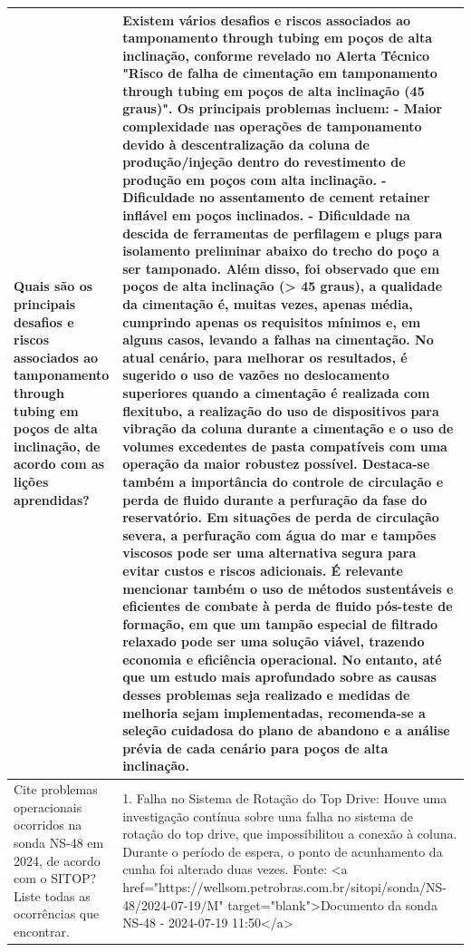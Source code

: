\begin{landscape}
\begin{longtable}{|p{3cm}|p{22cm}|}
Quais são os principais desafios e riscos associados ao tamponamento through tubing em poços de alta inclinação, de acordo com as lições aprendidas? & Existem vários desafios e riscos associados ao tamponamento through tubing em poços de alta inclinação, conforme revelado no Alerta Técnico "Risco de falha de cimentação em tamponamento through tubing em poços de alta inclinação (45 graus)". Os principais problemas incluem:
        \newline        - Maior complexidade nas operações de tamponamento devido à descentralização da coluna de produção/injeção dentro do revestimento de produção em poços com alta inclinação.
        - Dificuldade no assentamento de cement retainer inflável em poços inclinados.
        - Dificuldade na descida de ferramentas de perfilagem e plugs para isolamento preliminar abaixo do trecho do poço a ser tamponado.
        \newline        Além disso, foi observado que em poços de alta inclinação (> 45 graus), a qualidade da cimentação é, muitas vezes, apenas média, cumprindo apenas os requisitos mínimos e, em alguns casos, levando a falhas na cimentação.
        \newline        No atual cenário, para melhorar os resultados, é sugerido o uso de vazões no deslocamento superiores quando a cimentação é realizada com flexitubo, a realização do uso de dispositivos para vibração da coluna durante a cimentação e o uso de volumes excedentes de pasta compatíveis com uma operação da maior robustez possível.
        \newline        Destaca-se também a importância do controle de circulação e perda de fluido durante a perfuração da fase do reservatório. Em situações de perda de circulação severa, a perfuração com água do mar e tampões viscosos pode ser uma alternativa segura para evitar custos e riscos adicionais.
        \newline        É relevante mencionar também o uso de métodos sustentáveis e eficientes de combate à perda de fluido pós-teste de formação, em que um tampão especial de filtrado relaxado pode ser uma solução viável, trazendo economia e eficiência operacional.
        \newline        No entanto, até que um estudo mais aprofundado sobre as causas desses problemas seja realizado e medidas de melhoria sejam implementadas, recomenda-se a seleção cuidadosa do plano de abandono e a análise prévia de cada cenário para poços de alta inclinação. \\ \hline
Cite problemas operacionais ocorridos na sonda NS-48 em 2024, de acordo com o SITOP? Liste todas as ocorrências que encontrar. & 1. Falha no Sistema de Rotação do Top Drive: Houve uma investigação contínua sobre uma falha no sistema de rotação do top drive, que impossibilitou a conexão à coluna. Durante o período de espera, o ponto de acunhamento da cunha foi alterado duas vezes. Fonte: <a href="https://wellsom.petrobras.com.br/sitopi/sonda/NS-48/2024-07-19/M" target="blank">Documento da sonda NS-48 - 2024-07-19 11:50</a>

\end{longtable}
\end{landscape}
